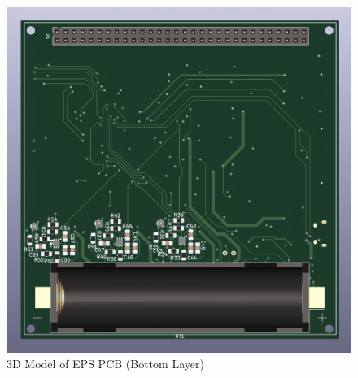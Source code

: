  
  \begin{figure}[H]
 	\centering
 	\includegraphics[width=0.99\columnwidth]{IMGS/eps_bk-4k.jpg}
 	\caption{\centering 3D Model of EPS PCB (Bottom Layer)}
 	\label{fig:eps3dbk}
 \end{figure}
 
 
